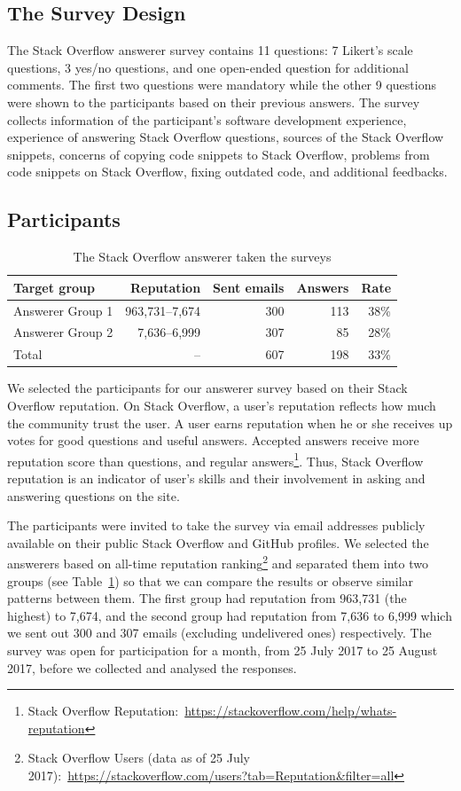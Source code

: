\documentclass{svjour3}                     %
\begin{document}
\subsection{The Survey Design}
The Stack Overflow answerer survey contains 11 questions: 7 Likert's scale
questions, 3 yes/no questions, and one open-ended question for additional
comments. The first two questions were mandatory while the other 9 questions
were shown to the participants based on their previous answers. The survey collects
information of the participant's software development experience, experience of
answering Stack Overflow questions, sources of the Stack Overflow snippets,
concerns of copying code snippets to Stack Overflow, problems from code 
snippets on Stack Overflow, fixing outdated code, and additional feedbacks.

\subsection{Participants}

\begin{table}
	\centering
	\caption{The Stack Overflow answerer taken the surveys}
	\label{tab:answerers}
	\begin{tabular}{lrrrr}
		\toprule
		Target group & Reputation & Sent emails & Answers & Rate \\
		\midrule
		Answerer Group 1 & 963,731--7,674 & 300 & 113 & 38\% \\
		Answerer Group 2 & 7,636--6,999 & 307 & 85 & 28\% \\
		\midrule
		Total & -- & 607 & 198 & 33\% \\
		\bottomrule
	\end{tabular}
\end{table}

We selected the participants for our answerer survey based on their Stack Overflow reputation. On
Stack Overflow, a user's reputation reflects how much the community trust the
user. A user earns reputation when he or she receives up votes for good
questions and useful answers. Accepted answers receive more reputation score
than questions, and regular answers\footnote{Stack Overflow
	Reputation:~\url{https://stackoverflow.com/help/whats-reputation}}. Thus, Stack
Overflow reputation is an indicator of user's skills and their involvement in
asking and answering questions on the site.

The participants were invited to take the survey via email addresses publicly available on their
public Stack Overflow and GitHub profiles. We selected the answerers based on
all-time reputation ranking\footnote{Stack Overflow Users (data as of 25 July
	2017):~\url{https://stackoverflow.com/users?tab=Reputation&filter=all}} and
separated them into two groups (see Table~\ref{tab:answerers}) so that we can
compare the results or observe similar patterns between them. 
The first group had reputation from 963,731 (the
highest) to 7,674, and the second group had reputation from 7,636 to 6,999 which
we sent out 300 and 307 emails (excluding undelivered ones) respectively. The
survey was open for participation for a month, from 25 July 2017 to 25 August
2017, before we collected and analysed the responses.
\end{document}
